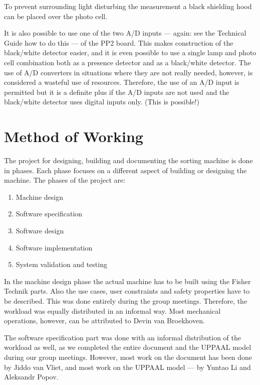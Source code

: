 \documentclass[a4paper,oneside,11pt]{report}
\begin{document}
To prevent surrounding light disturbing the measurement a black shielding hood can be placed over the photo cell.

It is also possible to use one of the two A/D inputs --- again: see the Technical Guide how to do this --- of the PP2 board. This makes construction of the black/white detector easier, and it is even possible to use a single lamp and photo cell combination both as a presence detector and as a black/white detector. The use of A/D converters in situations where they are not really needed, however, is considered a wasteful use of resources. Therefore, the use of an A/D input is permitted but it is a definite plus if the A/D inputs are not used and the black/white detector uses digital inputs only. (This is possible!)

\chapter{Method of Working}
The project for designing, building and documenting the sorting machine is done in phases. Each phase focuses on a different aspect of building or designing the machine. The phases of the project are:
\begin{enumerate}
\item Machine design
\item Software specification
\item Software design
\item Software implementation
\item System validation and testing
\end{enumerate}

In the machine design phase the actual machine has to be built using the Fisher Technik parts. Also the use cases, user constraints and safety properties have to be described. This was done entirely during the group meetings. Therefore, the workload was equally distributed in an informal way. Most mechanical operations, however, can be attributed to Devin van Broekhoven.

The software specification part was done with an informal distribution of the workload as well, as we completed the entire document and the UPPAAL model during our group meetings. However, most work on the document has been done by Jiddo van Vliet, and most work on the UPPAAL model --- by Yuntao Li and Aleksandr Popov.
\end{document}
